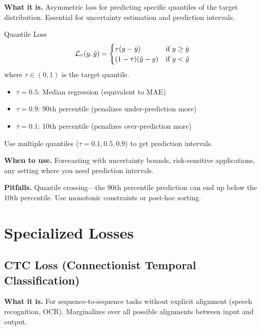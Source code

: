 \textbf{What it is.} Asymmetric loss for predicting specific quantiles of the target distribution. Essential for uncertainty estimation and prediction intervals.

\begin{mathresult}{Quantile Loss}
\begin{equation}
\mathcal{L}_\tau(y, \hat{y}) = \begin{cases}
\tau(y - \hat{y}) & \text{if } y \geq \hat{y} \\
(1-\tau)(\hat{y} - y) & \text{if } y < \hat{y}
\end{cases}
\end{equation}
where $\tau \in (0, 1)$ is the target quantile.
\end{mathresult}

\begin{itemize}
    \item $\tau = 0.5$: Median regression (equivalent to MAE)
    \item $\tau = 0.9$: 90th percentile (penalizes under-prediction more)
    \item $\tau = 0.1$: 10th percentile (penalizes over-prediction more)
\end{itemize}

Use multiple quantiles ($\tau = 0.1, 0.5, 0.9$) to get prediction intervals.

\textbf{When to use.} Forecasting with uncertainty bounds, risk-sensitive applications, any setting where you need prediction intervals.

\textbf{Pitfalls.} Quantile crossing---the 90th percentile prediction can end up below the 10th percentile. Use monotonic constraints or post-hoc sorting.

\section{Specialized Losses}
\label{sec:specialized_losses}

\subsection{CTC Loss (Connectionist Temporal Classification)}

\textbf{What it is.} For sequence-to-sequence tasks without explicit alignment (speech recognition, OCR). Marginalizes over all possible alignments between input and output.

